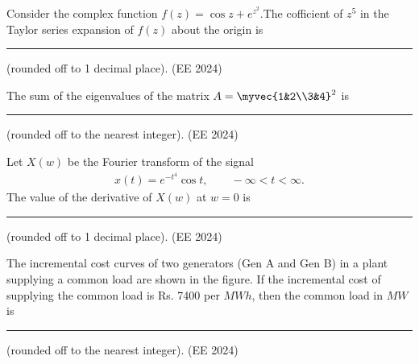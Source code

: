 \item Consider the complex function $f(z)= \cos{z}+e^{z^{2}}$.The cofficient of $z^5$ in the Taylor series expansion of $f(z)$ about the origin is \rule{2cm}{0.4pt} (rounded off to 1
decimal place).
\hfill{(EE 2024)}
\item The sum of the eigenvalues of the matrix $A=\myvec{1&2\\3&4}^2$ is \rule{2cm}{0.4pt} (rounded off to the nearest integer).
\hfill{(EE 2024)}
\item Let $X(w)$ be the Fourier transform of the signal
\begin{align}
x(t)=e^{-t^{4}}\cos{t},\qquad -\infty < t < \infty.
\end{align}
The value of the derivative of $X(w)$ at $w=0$ is \rule{2cm}{0.4pt} (rounded off to 1 decimal place).
\hfill{(EE 2024)}
\item The incremental cost curves of two generators (Gen A and Gen B) in a plant
supplying a common load are shown in the figure. If the incremental cost of supplying the common load is Rs. 7400 per $MWh$, then the common load in $MW$ is\rule{2cm}{0.4pt} (rounded off to the nearest integer).
\hfill{(EE 2024)}
